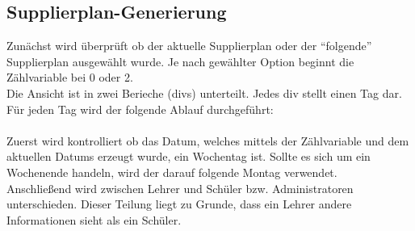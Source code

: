 \subsection{Supplierplan-Generierung}

Zunächst wird überprüft ob der aktuelle Supplierplan oder der \enquote{folgende} Supplierplan ausgewählt wurde. Je nach gewählter Option beginnt die Zählvariable bei 0 oder 2.\\
Die Ansicht ist in zwei Berieche (divs) unterteilt. Jedes div stellt einen Tag dar.\\
Für jeden Tag wird der folgende Ablauf durchgeführt:\\\\
Zuerst wird kontrolliert ob das Datum, welches mittels der Zählvariable und dem aktuellen Datums erzeugt wurde, ein Wochentag ist. Sollte es sich um ein Wochenende handeln, wird der darauf folgende Montag verwendet.\\
Anschließend wird zwischen Lehrer und Schüler bzw. Administratoren unterschieden. Dieser Teilung liegt zu Grunde, dass ein Lehrer andere Informationen sieht als ein Schüler.

%
%
%
% 
%
